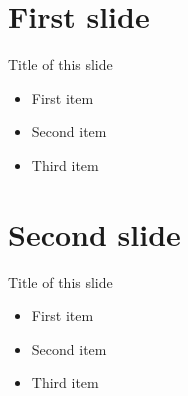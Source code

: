 \section{First slide}
\begin{frame}{Title of this slide}

\begin{itemize}[<+->]
\item First item
\item Second item
\item Third item
\end{itemize}

\end{frame}


\section{Second slide}
\begin{frame}{Title of this slide}

\begin{itemize}
\item First item
\item Second item
\item Third item
\end{itemize}

\end{frame}

\endinput
